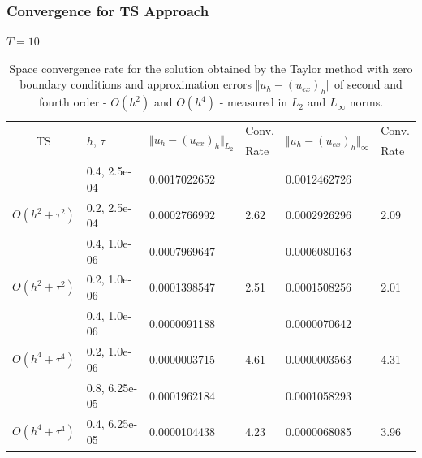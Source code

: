 \documentclass{beamer}
\begin{document}
\begin{frame}
\frametitle{Convergence for TS Approach}
$T = 10$
\begin{table}[ht]
\centering
\small
		\begin{tabular}{||c|l|ll|ll||}
			\hline
			\hline
      \multirow{2  }{*}{TS}        & \multirow{2  }{*}{$h$, $\tau$}  & \multirow{2  }{*}{$\Vert u_{h} - (u_{ex})_{h} \Vert_{L_2}$}  &Conv.& \multirow{2  }{*}{$\Vert u_{h} - (u_{ex})_{h} \Vert_{\infty}$ }  &Conv.  \\
	         &                    &                               & Rate   &                                        & Rate \\
   			\hline 
					\hline 
                                    &0.4, 2.5e-04          &0.0017022652 &            &0.0012462726    &      \\
      $O(h^2 + \tau^ 2)$ &0.2, 2.5e-04          &0.0002766992 & 2.62    &0.0002926296    &  2.09       \\
			\hline 
                                   &0.4, 1.0e-06        &0.0007969647 &            &0.0006080163    &      \\
      $O(h^2 + \tau^ 2)$ &0.2, 1.0e-06          &0.0001398547 & 2.51   &0.0001508256    &  2.01       \\
			\hline 
                                  &0.4, 1.0e-06        &  0.0000091188  &            &0.0000070642 &   \\
   $O(h^4+ \tau^4)$   &0.2, 1.0e-06          &0.0000003715   &4.61  &0.0000003563  & 4.31 \\
			\hline
                                 &0.8, 6.25e-05    & 0.0001962184   &        &  0.0001058293   &   \\
 $O(h^4+ \tau^4)$    &0.4, 6.25e-05     &0.0000104438 & 4.23  & 0.0000068085  & 3.96  \\
    \hline
			\hline 
		\end{tabular}
		\caption{Space convergence rate for the solution obtained by the Taylor method with zero boundary conditions and approximation errors $\Vert u_{h} - (u_{ex})_{h} \Vert$ of second and fourth order - $O(h^{2})$ and $O(h^{4})$ - measured in $L_2$ and $L_\infty$ norms.}
\label{tableA}
\end{table}

\end{frame}

\end{document}
